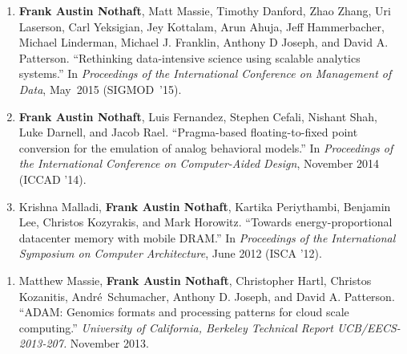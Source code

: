 \documentclass[10pt]{article} %
\newcounter{pubCtr}
\begin{document}
\begin {minipage}[t]{0.2\linewidth}
\vspace{0pt}
\end {minipage}
\begin {minipage}[t]{0.8\linewidth}
\vspace{0pt}


\begin{enumerate}
\setcounter{enumi}{\thepubCtr}
\item {\textbf{Frank Austin Nothaft}, Matt Massie, Timothy Danford, Zhao Zhang,
Uri Laserson, Carl Yeksigian, Jey Kottalam, Arun Ahuja, Jeff Hammerbacher,
Michael Linderman, Michael J. Franklin, Anthony D Joseph, and David A. Patterson.
``Rethinking data-intensive science using scalable analytics systems.'' In
\emph{Proceedings of the International Conference on Management of Data},
May~2015 (SIGMOD~'15).}
\item {\textbf{Frank Austin Nothaft}, Luis Fernandez, Stephen Cefali, Nishant Shah, Luke Darnell,
and Jacob Rael. ``Pragma-based floating-to-fixed point conversion for the emulation of analog
behavioral models.'' In \emph{Proceedings of the International Conference on Computer-Aided Design},
November 2014 (ICCAD '14).}
\item {Krishna Malladi, \textbf{Frank Austin Nothaft}, Kartika Periythambi, Benjamin Lee, 
Christos Kozyrakis, and Mark Horowitz. ``Towards energy-proportional datacenter memory with mobile DRAM.''
In \emph{Proceedings of the International Symposium on Computer Architecture}, June 2012 (ISCA '12).}
\setcounter{pubCtr}{\theenumi}
\end{enumerate}


\begin{enumerate}
\setcounter{enumi}{\thepubCtr}
\item {Matthew Massie, \textbf{Frank Austin Nothaft}, Christopher Hartl, Christos Kozanitis, Andr\'{e}~Schumacher,
Anthony D. Joseph, and David A. Patterson. ``ADAM: Genomics formats and processing patterns
for cloud scale computing.'' \emph{University of California, Berkeley Technical Report
UCB/EECS-2013-207.} November 2013.}
\setcounter{pubCtr}{\theenumi}
\end{enumerate}



\end{minipage}
\end{document}

